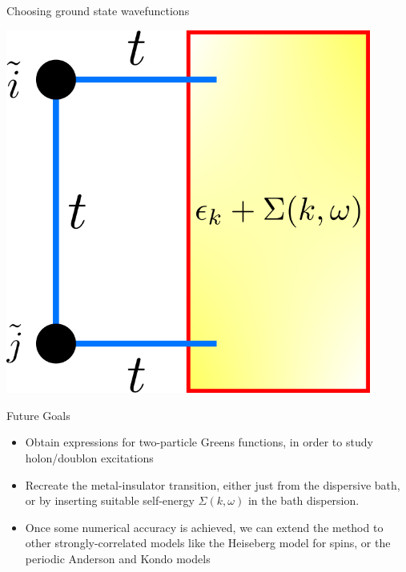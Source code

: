 \documentclass[aspectratio=169]{beamer}
\begin{document}
\begin{frame}{Choosing ground state wavefunctions}
\begin{itemize}
{\begin{minipage}{0.25\textwidth}
			\includegraphics[width=0.9\textwidth]{./dimer_dispersion_selfenergy.png}
		\end{minipage}
	}
\end{itemize}
\end{frame}

\begin{frame}{Future Goals}
	\begin{itemize}
		\item Obtain expressions for two-particle Greens functions, in order to study holon/doublon excitations
		\item Recreate the metal-insulator transition, either just from the dispersive bath, or by inserting suitable self-energy $\Sigma(k,\omega)$ in the bath dispersion.
		\item Once some numerical accuracy is achieved, we can extend the method to other strongly-correlated models like the Heiseberg model for spins, or the periodic Anderson and Kondo models
	\end{itemize}
\end{frame}
\end{document}
